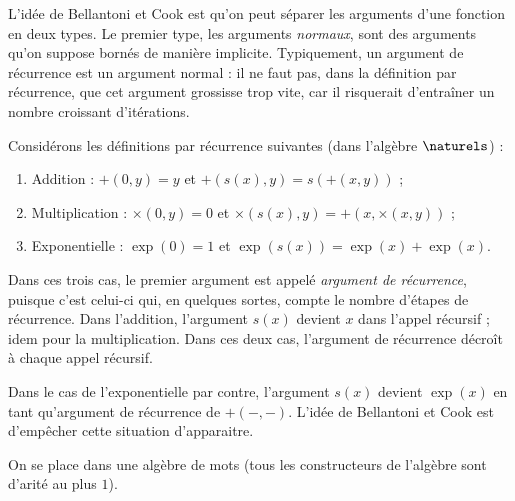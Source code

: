 \documentclass{report}
\begin{document}
			L'idée de Bellantoni et Cook \cite{BellantoniCook1992} est qu'on peut séparer les arguments d'une fonction en deux types. Le premier type, les arguments \emph{normaux}, sont des arguments qu'on suppose bornés de manière implicite. Typiquement, un argument de récurrence est un argument normal : il ne faut pas, dans la définition par récurrence, que cet argument grossisse trop vite, car il risquerait d'entraîner un nombre croissant d'itérations. 
			
			\begin{example}
				
				Considérons les définitions par récurrence suivantes (dans l'algèbre $\naturels$) :
				
				\begin{enumerate}
					\item	\label{itm:addition}
							Addition : $+(0 , y) = y$ et $+(s(x), y) = s\left( +(x, y)\right)$ ; 
							
					\item	\label{itm:multiplication}
							Multiplication : $\times \left( 0, y \right) = 0$ et $\times \left( s(x), y \right) = +\left( x, \times\left( x, y \right) \right)$ ; 
							
					\item	\label{itm:exponentielle}
							Exponentielle : $\exp(0) = 1$ et $\exp(s(x)) = \exp(x) + \exp(x)$.
				\end{enumerate}
				
				Dans ces trois cas, le premier argument est appelé \emph{argument de récurrence}, puisque c'est celui-ci qui, en quelques sortes, compte le nombre d'étapes de récurrence. Dans l'addition, l'argument $s(x)$ devient $x$ dans l'appel récursif ; idem pour la multiplication. Dans ces deux cas, l'argument de récurrence décroît à chaque appel récursif. 
				
				Dans le cas de l'exponentielle par contre, l'argument $s(x)$ devient $\exp(x)$ en tant qu'argument de récurrence de $+(-,-)$. L'idée de Bellantoni et Cook est d'empêcher cette situation d'apparaitre.
				
			\end{example}
			
			
			
			
			On se place dans une algèbre de mots (tous les constructeurs de l'algèbre sont d'arité au plus $1$).
			
\end{document}
